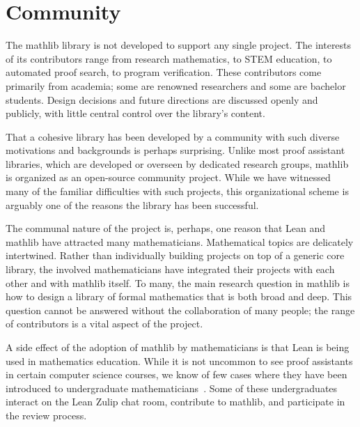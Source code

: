 \documentclass[sigplan]{acmart}\settopmatter{}
\newcommand{\mathlib}{\textsf{mathlib}\xspace}
\begin{document}
\section{Community}
\label{section:community}


The \mathlib library is not developed to support any single project.
The interests of its contributors range from research mathematics, to STEM education, to automated proof search, to program verification.
These contributors come primarily from academia; some are renowned researchers and some are bachelor students.
Design decisions and future directions are discussed openly and publicly, with little central control over the library's content.

That a cohesive library has been developed by a community with such diverse motivations and backgrounds is perhaps surprising.
Unlike most proof assistant libraries, which are developed or overseen by dedicated research groups, \mathlib is organized as an open-source community project.
While we have witnessed many of the familiar difficulties with such projects, this organizational scheme is arguably one of the reasons the library has been successful.

The communal nature of the project is, perhaps, one reason that Lean and \mathlib have attracted many mathematicians.
Mathematical topics are delicately intertwined.
Rather than individually building projects on top of a generic core library, the involved mathematicians have integrated their projects with each other and with \mathlib itself.
To many, the main research question in \mathlib is how to design a library of formal mathematics that is both broad and deep.
This question cannot be answered without the collaboration of many people; the range of contributors is a vital aspect of the project.

A side effect of the adoption of \mathlib by mathematicians is that Lean is being used in mathematics education.
While it is not uncommon to see proof assistants in certain computer science courses, we know of few cases where they have been introduced to undergraduate mathematicians~\cite{Neup19}.
Some of these undergraduates interact on the Lean Zulip chat room, contribute to \mathlib, and participate in the review process.
\end{document}
